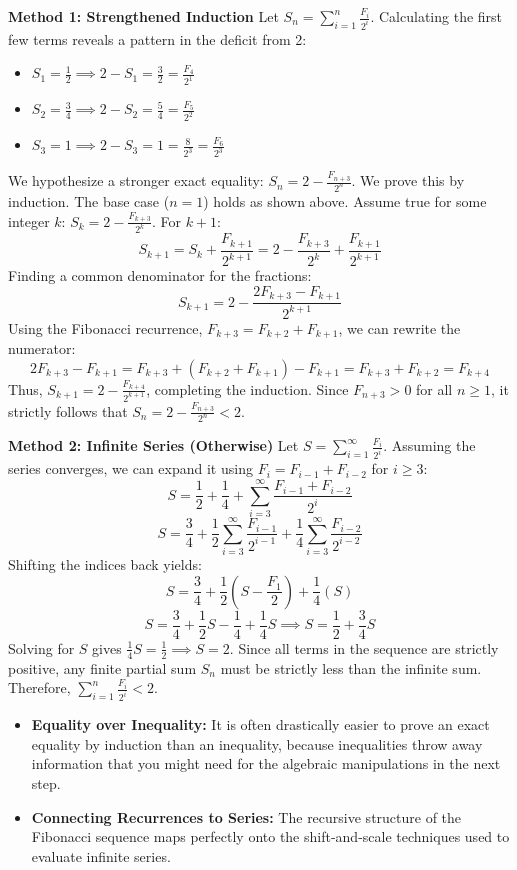 \begin{solution}
\textbf{Method 1: Strengthened Induction}
Let $S_n = \sum_{i=1}^n \frac{F_i}{2^i}$. Calculating the first few terms reveals a pattern in the deficit from 2:
\begin{itemize}[leftmargin=*]
    \item $S_1 = \frac{1}{2} \implies 2 - S_1 = \frac{3}{2} = \frac{F_4}{2^1}$
    \item $S_2 = \frac{3}{4} \implies 2 - S_2 = \frac{5}{4} = \frac{F_5}{2^2}$
    \item $S_3 = 1 \implies 2 - S_3 = 1 = \frac{8}{2^3} = \frac{F_6}{2^3}$
\end{itemize}

We hypothesize a stronger exact equality: $S_n = 2 - \frac{F_{n+3}}{2^n}$.
We prove this by induction. The base case ($n=1$) holds as shown above.
Assume true for some integer $k$: $S_k = 2 - \frac{F_{k+3}}{2^k}$.
For $k+1$:
\[
S_{k+1} = S_k + \frac{F_{k+1}}{2^{k+1}} = 2 - \frac{F_{k+3}}{2^k} + \frac{F_{k+1}}{2^{k+1}}
\]
Finding a common denominator for the fractions:
\[
S_{k+1} = 2 - \frac{2F_{k+3} - F_{k+1}}{2^{k+1}}
\]
Using the Fibonacci recurrence, $F_{k+3} = F_{k+2} + F_{k+1}$, we can rewrite the numerator:
\[
2F_{k+3} - F_{k+1} = F_{k+3} + (F_{k+2} + F_{k+1}) - F_{k+1} = F_{k+3} + F_{k+2} = F_{k+4}
\]
Thus, $S_{k+1} = 2 - \frac{F_{k+4}}{2^{k+1}}$, completing the induction.
Since $F_{n+3} > 0$ for all $n \geqslant 1$, it strictly follows that $S_n = 2 - \frac{F_{n+3}}{2^n} < 2$.

\textbf{Method 2: Infinite Series (Otherwise)}
Let $S = \sum_{i=1}^\infty \frac{F_i}{2^i}$. Assuming the series converges, we can expand it using $F_i = F_{i-1} + F_{i-2}$ for $i \geqslant 3$:
\[
S = \frac{1}{2} + \frac{1}{4} + \sum_{i=3}^\infty \frac{F_{i-1} + F_{i-2}}{2^i}
\]
\[
S = \frac{3}{4} + \frac{1}{2}\sum_{i=3}^\infty \frac{F_{i-1}}{2^{i-1}} + \frac{1}{4}\sum_{i=3}^\infty \frac{F_{i-2}}{2^{i-2}}
\]
Shifting the indices back yields:
\[
S = \frac{3}{4} + \frac{1}{2}\left(S - \frac{F_1}{2}\right) + \frac{1}{4}(S)
\]
\[
S = \frac{3}{4} + \frac{1}{2}S - \frac{1}{4} + \frac{1}{4}S \implies S = \frac{1}{2} + \frac{3}{4}S
\]
Solving for $S$ gives $\frac{1}{4}S = \frac{1}{2} \implies S = 2$.
Since all terms in the sequence are strictly positive, any finite partial sum $S_n$ must be strictly less than the infinite sum. Therefore, $\sum_{i=1}^n \frac{F_i}{2^i} < 2$.
\end{solution}

\begin{takeaways}
\begin{itemize}[leftmargin=*]
    \item \textbf{Equality over Inequality:} It is often drastically easier to prove an exact equality by induction than an inequality, because inequalities throw away information that you might need for the algebraic manipulations in the next step.
    \item \textbf{Connecting Recurrences to Series:} The recursive structure of the Fibonacci sequence maps perfectly onto the shift-and-scale techniques used to evaluate infinite series.
\end{itemize}
\end{takeaways}

